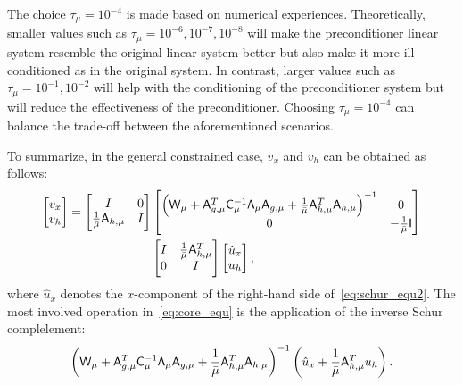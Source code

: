 \begin{remark}
The choice $\tau_{\mu} = 10^{-4}$ is made based on numerical experiences. Theoretically, smaller values such as 
$\tau_{\mu} = 10^{-6}, 10^{-7}, 10^{-8}$ will make the preconditioner linear system resemble the original linear system better but also make it more ill-conditioned as in the original system. In contrast, larger values such as 
$\tau_{\mu} = 10^{-1}, 10^{-2}$ will help with the conditioning of the preconditioner system but will reduce the effectiveness of the preconditioner. Choosing $\tau_{\mu} = 10^{-4}$ can balance the trade-off between the aforementioned scenarios. 
\end{remark}

To summarize, in the general constrained case, $v_x$ and $v_h$ can be obtained as follows:
\begin{align}\label{eq:core_equ}
\begin{bmatrix} v_x \\ v_h  \end{bmatrix} 
=
\begin{bmatrix}
I & 0 \\
\frac{1}{\bar{\mu}} \mathsf{A}_{h,\mu}  &  I 
\end{bmatrix} & 
\begin{bmatrix}
\left(\mathsf{W}_\mu +  \mathsf{A}_{g,\mu}^T  \mathsf{C}_\mu^{-1} \mathsf{\Lambda}_\mu  \mathsf{A}_{g,\mu}  
+ \frac{1}{\bar{\mu}}  \mathsf{A}_{h,\mu}^T \mathsf{A}_{h,\mu} \right)^{-1}    & 0  \notag \\
0  &  -\frac{1}{\bar{\mu}}\mathsf{I} 
\end{bmatrix} \\
& \begin{bmatrix}
I  & \frac{1}{\bar{\mu}} \mathsf{A}_{h,\mu}^T  \\
0  &  I
\end{bmatrix}
\begin{bmatrix}
\hat{u}_{x} \\ u_h
\end{bmatrix},
\end{align}
where $\hat{u}_x$ denotes the $x$-component of the right-hand side of~\eqref{eq:schur_equ2}.  The most involved operation in~\eqref{eq:core_equ} is the application of the inverse Schur complelement:
\begin{equation}
\left(\mathsf{W}_\mu +  \mathsf{A}_{g,\mu}^T  \mathsf{C}_\mu^{-1} \mathsf{\Lambda}_\mu  \mathsf{A}_{g,\mu}  
+ \frac{1}{\bar{\mu}}  \mathsf{A}_{h,\mu}^T \mathsf{A}_{h,\mu} \right)^{-1}  \left(\hat{u}_{x} + \frac{1}{\bar{\mu}} \mathsf{A}_{h,\mu}^T u_{h}  \right). 
\end{equation}
